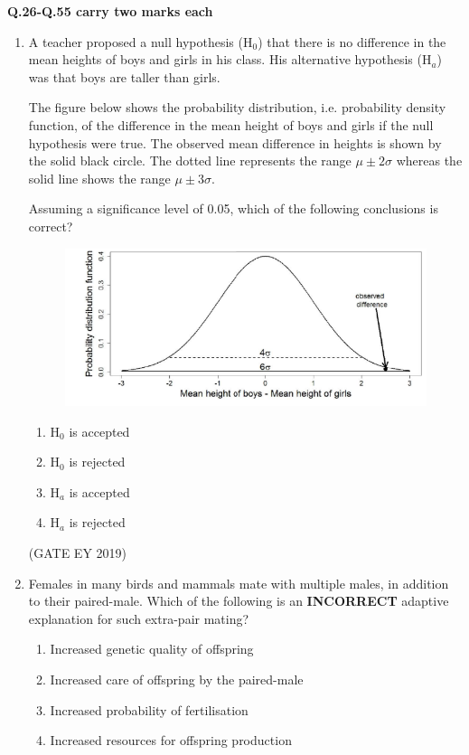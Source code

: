 \documentclass[journal,12pt,onecolumn]{IEEEtran}
\theoremstyle{remark}
\begin{document}
\textbf{Q.26-Q.55 carry two marks each}
\begin{enumerate}[resume]
\item A teacher proposed a null hypothesis (H$_0$) that there is no difference in the mean heights of boys and girls in his class. His alternative hypothesis (H$_a$) was that boys are taller than girls.  

The figure below shows the probability distribution, i.e. probability density function, of the difference in the mean height of boys and girls if the null hypothesis were true. The observed mean difference in heights is shown by the solid black circle. The dotted line represents the range $\mu \pm 2\sigma$ whereas the solid line shows the range $\mu \pm 3\sigma$.  


Assuming a significance level of 0.05, which of the following conclusions is correct? 
\begin{figure}[h]
    \centering
    \includegraphics[]{figs/26.png}
    \caption{}
    \label{fig:3}
\end{figure}

\begin{multicols}{2}
\begin{enumerate}
\item H$_0$ is accepted
\item H$_0$ is rejected
\item H$_a$ is accepted
\item H$_a$ is rejected
\end{enumerate}
\end{multicols}

\hfill{(GATE EY 2019)}
\item Females in many birds and mammals mate with multiple males, in addition to their paired-male. Which of the following is an \textbf{INCORRECT} adaptive explanation for such extra-pair mating?  
\begin{multicols}{2}
\begin{enumerate}
\item   Increased genetic quality of offspring
\item   Increased care of offspring by the paired-male
\item   Increased probability of fertilisation
\item   Increased resources for offspring production
\end{enumerate}
\end{multicols}


\end{enumerate}
\end{document}
